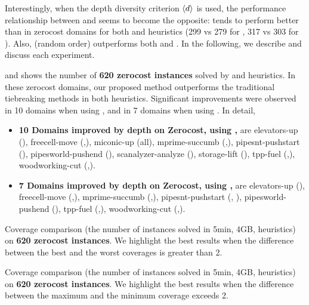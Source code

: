 Interestingly, when the depth diversity criterion ${\left<d\right>}$ is used, 
the performance relationship between \lifo and \fifo seems to become the opposite:
\fifo tends to perform better than \lifo in zerocost domains for both
\lmcut and \mands heuristics (299 vs 279 for \lmcut, 317 vs 303 for \mands).
Also, \ro (random order) outperforms both \fifo and \lifo.
In the following, we describe and discuss each experiment.

 and  shows the number of \textbf{620 zerocost
instances} solved by \lmcut and \mands heuristics. In these
zerocost domains, our proposed method outperforms the traditional tiebreaking methods in both heuristics.
Significant improvements were observed in 10 domains when using \lmcut, and in 7 domains when using \mands.
In detail,
\begin{itemize}
 \item \textbf{10 Domains improved by depth on Zerocost, using \lmcut,} are elevators-up (\ro), freecell-move (\fifo,\ro),
       miconic-up (all), mprime-succumb (\fifo,\ro), pipesnt-pushstart (\ro), pipesworld-pushend (\ro),
       scanalyzer-analyze (\lifo), storage-lift (\fifo), tpp-fuel (\fifo,\ro), woodworking-cut (\fifo,\ro).
 \item \textbf{7 Domains improved by depth on Zerocost, using \mands,} are elevators-up (\ro), freecell-move (\fifo,\ro),
       mprime-succumb (\fifo,\ro), pipesnt-pushstart (\fifo, \ro), pipesworld-pushend (\ro),
       tpp-fuel (\fifo,\ro), woodworking-cut (\fifo,\ro).
\end{itemize}


\begin{table}[htbp]
 {
 \centering
 
  \caption{ Coverage comparison (the number of instances solved in 5min, 4GB, \lmcut heuristics) on \textbf{620
 zerocost instances}.  We highlight the best results when the difference between the best and the worst coverages
 is greater than 2.  }
 \label{tbl:lmcut-zerocost-full}}
\end{table}

\begin{table}[htbp]
 {
 \centering
 
  \caption{
 Coverage comparison (the number of instances solved in 5min, 4GB, \mands heuristics)
 on \textbf{620 zerocost instances}. We highlight the
 best results when the difference between the maximum and the minimum coverage exceeds 2.
 }
 \label{tbl:mands-zerocost-full}
 }
\end{table}

